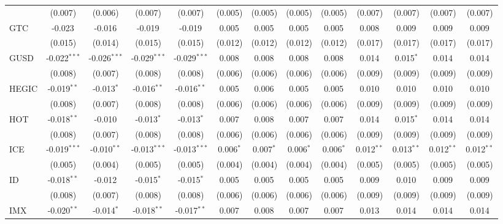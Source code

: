 \begin{table}[!htbp]
\begin{tabular}{@{\extracolsep{5pt}}lcccccccccccc}
  & (0.007) & (0.006) & (0.007) & (0.007) & (0.005) & (0.005) & (0.005) & (0.005) & (0.007) & (0.007) & (0.007) & (0.007) \\
 GTC & -0.023$^{}$ & -0.016$^{}$ & -0.019$^{}$ & -0.019$^{}$ & 0.005$^{}$ & 0.005$^{}$ & 0.005$^{}$ & 0.005$^{}$ & 0.008$^{}$ & 0.009$^{}$ & 0.009$^{}$ & 0.009$^{}$ \\
  & (0.015) & (0.014) & (0.015) & (0.015) & (0.012) & (0.012) & (0.012) & (0.012) & (0.017) & (0.017) & (0.017) & (0.017) \\
 GUSD & -0.022$^{***}$ & -0.026$^{***}$ & -0.029$^{***}$ & -0.029$^{***}$ & 0.008$^{}$ & 0.008$^{}$ & 0.008$^{}$ & 0.008$^{}$ & 0.014$^{}$ & 0.015$^{*}$ & 0.014$^{}$ & 0.014$^{}$ \\
  & (0.008) & (0.007) & (0.008) & (0.008) & (0.006) & (0.006) & (0.006) & (0.006) & (0.009) & (0.009) & (0.009) & (0.009) \\
 HEGIC & -0.019$^{**}$ & -0.013$^{*}$ & -0.016$^{**}$ & -0.016$^{**}$ & 0.005$^{}$ & 0.006$^{}$ & 0.005$^{}$ & 0.005$^{}$ & 0.010$^{}$ & 0.010$^{}$ & 0.010$^{}$ & 0.010$^{}$ \\
  & (0.008) & (0.007) & (0.008) & (0.008) & (0.006) & (0.006) & (0.006) & (0.006) & (0.009) & (0.009) & (0.009) & (0.009) \\
 HOT & -0.018$^{**}$ & -0.010$^{}$ & -0.013$^{*}$ & -0.013$^{*}$ & 0.007$^{}$ & 0.008$^{}$ & 0.007$^{}$ & 0.007$^{}$ & 0.014$^{}$ & 0.015$^{*}$ & 0.014$^{}$ & 0.014$^{}$ \\
  & (0.008) & (0.007) & (0.008) & (0.008) & (0.006) & (0.006) & (0.006) & (0.006) & (0.009) & (0.009) & (0.009) & (0.009) \\
 ICE & -0.019$^{***}$ & -0.010$^{**}$ & -0.013$^{***}$ & -0.013$^{***}$ & 0.006$^{*}$ & 0.007$^{*}$ & 0.006$^{*}$ & 0.006$^{*}$ & 0.012$^{**}$ & 0.013$^{**}$ & 0.012$^{**}$ & 0.012$^{**}$ \\
  & (0.005) & (0.004) & (0.005) & (0.005) & (0.004) & (0.004) & (0.004) & (0.004) & (0.005) & (0.005) & (0.005) & (0.005) \\
 ID & -0.018$^{**}$ & -0.012$^{}$ & -0.015$^{*}$ & -0.015$^{*}$ & 0.005$^{}$ & 0.005$^{}$ & 0.005$^{}$ & 0.005$^{}$ & 0.009$^{}$ & 0.010$^{}$ & 0.009$^{}$ & 0.009$^{}$ \\
  & (0.008) & (0.007) & (0.008) & (0.008) & (0.006) & (0.006) & (0.006) & (0.006) & (0.009) & (0.009) & (0.009) & (0.009) \\
 IMX & -0.020$^{**}$ & -0.014$^{*}$ & -0.018$^{**}$ & -0.017$^{**}$ & 0.007$^{}$ & 0.008$^{}$ & 0.007$^{}$ & 0.007$^{}$ & 0.013$^{}$ & 0.014$^{}$ & 0.014$^{}$ & 0.014$^{}$ \\

\end{tabular}
\end{table}
